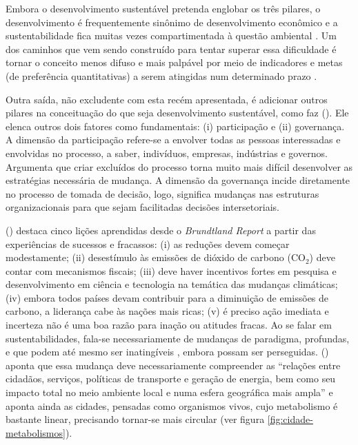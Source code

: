 Embora o desenvolvimento sustentável pretenda englobar os três pilares, o desenvolvimento é frequentemente sinônimo de desenvolvimento econômico e a sustentabilidade fica muitas vezes compartimentada à questão ambiental \cite{ONU2010}. Um dos caminhos que vem sendo construído para tentar superar essa dificuldade é tornar o conceito menos difuso e mais palpável por meio de indicadores \cite{CHAMBERS2000,BOULANGER2008,BARRETT2010,FORTES2012} e metas (de preferência quantitativas) a serem atingidas num determinado prazo \cite{ONU2010,ONU2014}.

Outra saída, não excludente com esta recém apresentada, é adicionar outros pilares na conceituação do que seja desenvolvimento sustentável, como faz 
 (\citeyear{BANISTER2005}). Ele elenca outros dois fatores como fundamentais: (i) participação e (ii) governança. A dimensão da participação refere-se a envolver todas as pessoas interessadas e envolvidas no processo, a saber, indivíduos, empresas, indústrias e governos. Argumenta que criar excluídos do processo torna muito mais difícil desenvolver as estratégias necessária de mudança. A dimensão da governança incide diretamente no processo de tomada de decisão, logo, significa mudanças nas estruturas organizacionais para que sejam facilitadas decisões intersetoriais.

 (\citeyear{BANISTER2005}) destaca cinco lições aprendidas desde o \emph{Brundtland Report} a partir das experiências de sucessos e fracassos: (i) as reduções devem começar modestamente; (ii) desestímulo às emissões de dióxido de carbono (CO$_2$) deve contar com mecanismos fiscais; (iii) deve haver incentivos fortes em pesquisa e desenvolvimento em ciência e tecnologia na temática das mudanças climáticas; (iv) embora todos países devam contribuir para a diminuição de emissões de carbono, a liderança cabe às nações mais ricas; (v) é preciso ação imediata e incerteza não é uma boa razão para inação ou atitudes fracas.
Ao se falar em sustentabilidades, fala-se necessariamente de mudanças de paradigma, profundas, e que podem até mesmo ser inatingíveis \cite{GLASBY2002}, embora possam ser perseguidas.  (\citeyear{ROGERS2000}) aponta que essa mudança deve necessariamente compreender as ``relações entre cidadãos, serviços, políticas de transporte e geração de energia, bem como seu impacto total no meio ambiente local e numa esfera geográfica mais ampla'' e aponta ainda as cidades, pensadas como organismos vivos, cujo metabolismo é bastante linear, precisando tornar-se mais circular (ver figura \ref{fig:cidade-metabolismos}).

